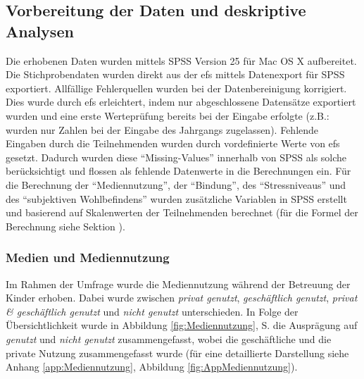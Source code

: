 \subsection{Vorbereitung der Daten und deskriptive Analysen}
Die erhobenen Daten wurden mittels SPSS Version 25 für Mac OS X aufbereitet. Die Stichprobendaten wurden direkt aus der \acrfull{efs} \cite{Questback2018} mittels Datenexport für SPSS exportiert. Allfällige Fehlerquellen wurden bei der Datenbereinigung korrigiert. Dies wurde durch \acrshort{efs} erleichtert, indem nur abgeschlossene Datensätze exportiert wurden und eine erste Werteprüfung bereits bei der Eingabe erfolgte (z.B.: wurden nur Zahlen bei der Eingabe des Jahrgangs zugelassen). Fehlende Eingaben durch die Teilnehmenden wurden durch vordefinierte Werte von \acrshort{efs} gesetzt. Dadurch wurden diese \enquote{Missing-Values} innerhalb von SPSS als solche berücksichtigt und flossen als fehlende Datenwerte in die Berechnungen ein. Für die Berechnung der \enquote{Mediennutzung}, der \enquote{Bindung}, des \enquote{Stressniveaus} und des \enquote{subjektiven Wohlbefindens} wurden zusätzliche Variablen in SPSS erstellt und basierend auf Skalenwerten der Teilnehmenden berechnet (für die Formel der Berechnung siehe Sektion \textit{}).

\subsubsection{Medien und Mediennutzung}
Im Rahmen der Umfrage wurde die Mediennutzung während der Betreuung der Kinder erhoben. Dabei wurde zwischen \textit{privat genutzt}, \textit{geschäftlich genutzt}, \textit{privat \& geschäftlich genutzt} und \textit{nicht genutzt} unterschieden. In Folge der Übersichtlichkeit wurde in Abbildung \ref{fig:Mediennutzung}, S. \pageref{fig:Mediennutzung} die Ausprägung auf \textit{genutzt} und \textit{nicht genutzt} zusammengefasst, wobei die geschäftliche und die private Nutzung zusammengefasst wurde (für eine detaillierte Darstellung siehe Anhang \ref{app:Mediennutzung}, Abbildung \ref{fig:AppMediennutzung}).

